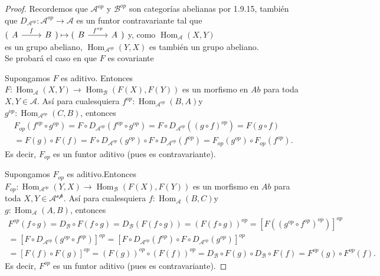 \documentclass{article}
\begin{document}
\begin{enumerate}[label=\textbf{Ej \arabic*.}]
		\begin{proof} Recordemos que $\mathscr{A}^{op}$ y $\mathscr{B}^{op}$ son categorías abelianas por 1.9.15, también que
			$D_{\mathscr{A}^{op}}:\mathscr{A}^{op}\longrightarrow \mathscr{A}$ es un funtor contravariante tal que 
			$(\begin{tikzcd} A\arrow{r}{f}&B\end{tikzcd})\mapsto(\begin{tikzcd} B\arrow{r}{f^{op}}&A\end{tikzcd})$ y, como $\operatorname{Hom}_\mathscr{A}
			(X,Y)$ \\es un grupo abeliano, $\displaystyle\operatorname{Hom}_{\mathscr{A}^{op}}(Y,X)$ es también un grupo abeliano.\\
			
			Se probará el caso en que $F$ es covariante
			
			 Supongamos $F$ es aditivo. Entonces \\$F:\operatorname{Hom}_\mathscr{A}(X,Y)\longrightarrow
			\operatorname{Hom}_\mathscr{B}(F(X),F(Y))$ es un morfismo en $Ab$ para toda $X,Y\in \mathscr{A}$. Así para cualesquiera
			$f^{op}:\operatorname{Hom}_{\mathscr{A}^{op}}(B,A)$\quad y\\
			$g^{op}:\operatorname{Hom}_{\mathscr{A}^{op}}(C,B)$, entonces
			\begin{gather*}
				F_{op}(f^{op}\circ g^{op})=F\circ D_{\mathscr{A}^{op}}(f^{op}\circ g^{op})=F\circ D_{\mathscr{A}^{op}}((g\circ f)^{op})=F(g\circ f)\\
				=F(g)\circ F(f)=F\circ D_{\mathscr{A}^{op}}(g^{op})\circ F\circ D_{\mathscr{A}^{op}}(f^{op})=F_{op}(g^{op})\circ F_{op}(f^{op}).
			\end{gather*}
			Es decir,  $F_{op}$ es un funtor aditivo (pues es contravariante).
			
			 Supongamos $F_{op}$ es aditivo.Entonces \\$F_{op}:\operatorname{Hom}_{\mathscr{A}^{op}}(Y,X)\longrightarrow
			\operatorname{Hom}_\mathscr{B}(F(X),F(Y))$ es un morfismo en $Ab$ para toda $X,Y\in \mathscr{A^{op}}$. Así para cualesquiera
			$f:\operatorname{Hom}_{\mathscr{A}}(B,C)$\quad y\\
			$g:\operatorname{Hom}_{\mathscr{A}}(A,B)$, entonces
			\begin{gather*}
				F^{op}(f\circ g)=D_{\mathscr{B}}\circ F(f\circ g)=D_{\mathscr{B}}(F(f\circ g))=(F(f\circ g))^{op}=[F((g^{op}\circ f^{op})^{op})]^{op}\\
				=[F\circ D_{\mathscr{A}^{op}}(g^{op}\circ f^{op})]^{op}=[F\circ D_{\mathscr{A}^{op}}(f^{op})\circ F\circ D_{\mathscr{A}^{op}}(g^{op})]^{op}\\
				=[F(f)\circ F(g)]^{op}=(F(g))^{op}\circ (F(f))^{op}=D_{\mathscr{B}}\circ F(g)\circ D_{\mathscr{B}}\circ F(f)=F^{op}(g)\circ F^{op}(f).
			\end{gather*}
			Es decir,  $F^{op}$ es un funtor aditivo (pues es contravariante).
			

\end{proof}
\end{enumerate}
\end{document}
